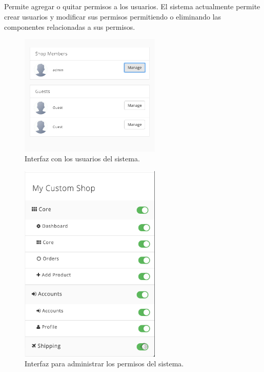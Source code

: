 \subsection{\accountsEF}

	Permite agregar o quitar permisos a los usuarios. El sistema actualmente permite crear usuarios y modificar sus permisos permitiendo o eliminando las componentes relacionadas a sus permisos.

	\begin{figure}[H]
		\centering
		\includegraphics[width=0.6\textwidth]{figuras/dashboard/account/users.png}
		\caption{Interfaz con los usuarios del sistema.}
		\label{figure:dashboard:account:users}
	\end{figure}


	\begin{figure}[H]
		\centering
		\includegraphics[width=0.6\textwidth]{figuras/dashboard/account/permisos.png}
		\caption{Interfaz para administrar los permisos del sistema.}
		\label{figure:dashboard:account:permisos}
	\end{figure}

